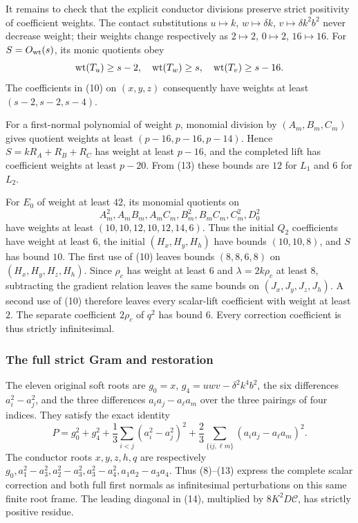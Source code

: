 It remains to check that the explicit conductor divisions preserve
strict positivity of coefficient weights. The contact substitutions
$u\mapsto k$, $w\mapsto\delta k$, $v\mapsto\delta k^2b^2$
never decrease weight; their weights change respectively as
$2\mapsto2$, $0\mapsto2$, $16\mapsto16$.
For $S=O_{\mathrm{wt}}(s)$, its monic quotients obey
\[
 \operatorname{wt}(T_u)\geq s-2,\quad \operatorname{wt}(T_w)\geq s,\quad
 \operatorname{wt}(T_v)\geq s-16.
\]
The coefficients in (10) on $(x,y,z)$ consequently have weights
at least $(s-2,s-2,s-4)$.

For a first-normal polynomial of weight $p$, monomial division by
$(A_m,B_m,C_m)$ gives quotient weights at least
$(p-16,p-16,p-14)$. Hence $S=kR_A+R_B+R_C$ has weight at least
$p-16$, and the completed lift has coefficient weights at least
$p-20$. From (13) these bounds are $12$ for $L_1$ and $6$ for $L_2$.

For $E_0$ of weight at least $42$, its monomial quotients on
\[
 A_m^2,A_mB_m,A_mC_m,B_m^2,B_mC_m,C_m^2,D_0^2
\]
have weights at least $(10,10,12,10,12,14,6)$. Thus the initial
$Q_2$ coefficients have weight at least $6$, the initial
$(H_x,H_y,H_h)$ have bounds $(10,10,8)$, and $S$ has bound $10$.
The first use of (10) leaves bounds $(8,8,6,8)$ on
$(H_x,H_y,H_z,H_h)$. Since $\rho_c$ has weight at least $6$ and
$\lambda=2k\rho_c$ at least $8$, subtracting the gradient relation
leaves the same bounds on $(J_x,J_y,J_z,J_h)$. A second use of
(10) therefore leaves every scalar-lift coefficient with weight at
least $2$. The separate coefficient $2\rho_c$ of $q^2$ has bound
$6$. Every correction coefficient is thus strictly infinitesimal.

\subsubsection*{The full strict Gram and restoration}

The eleven original soft roots are $g_0=x$, $g_4=uwv-\delta^2k^4b^2$,
the six differences $a_i^2-a_j^2$, and the three differences
$a_ia_j-a_\ell a_m$ over the three pairings of four indices.
They satisfy the exact identity
\begin{equation}
 P=g_0^2+g_4^2+\frac13\sum_{i<j}(a_i^2-a_j^2)^2
       +\frac23\sum_{\{ij,\ell m\}}(a_ia_j-a_\ell a_m)^2. \tag{14}
\end{equation}
The conductor roots $x,y,z,h,q$ are respectively
$g_0,a_1^2-a_3^2,a_2^2-a_3^2,a_3^2-a_4^2,a_1a_2-a_3a_4$.
Thus (8)--(13) express the complete scalar correction and both full
first normals as infinitesimal perturbations on this same finite
root frame. The leading diagonal in (14), multiplied by
$8K^2D\mathcal C$, has strictly positive residue.


